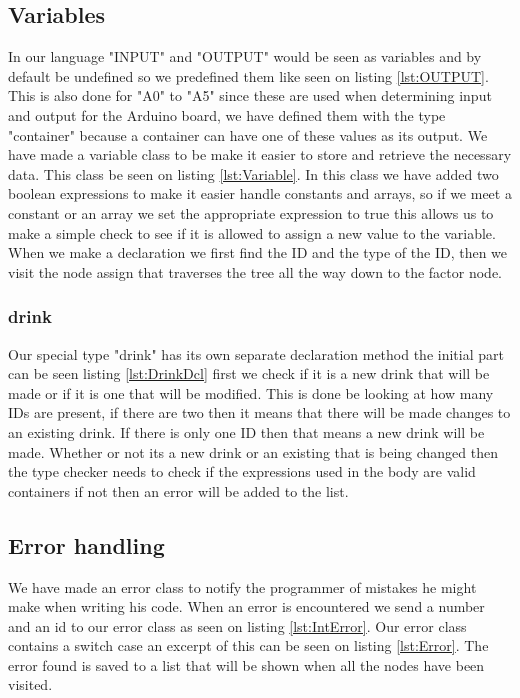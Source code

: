 \subsection*{Variables}
In our language "INPUT" and "OUTPUT" would be seen as variables and by default be undefined so we predefined them like seen on listing \ref{lst:OUTPUT}. This is also done for "A0" to "A5" since these are used when determining input and output for the Arduino board, we have defined them with the type "container" because a container can have one of these values as its output.
We have made a variable class to be make it easier to store and retrieve the necessary data. This class be seen on listing \ref{lst:Variable}. In this class we have added two boolean expressions to make it easier handle constants and arrays, so if we meet a constant or an array we set the appropriate expression to true this allows us to make a simple check to see if it is allowed to assign a new value to the variable.
When we make a declaration we first find the ID and the type of the ID, then we visit the node assign that traverses the tree all the way down to the factor node.

\subsubsection*{drink}
Our special type "drink" has its own separate declaration method the initial part can be seen listing \ref{lst:DrinkDcl} first we check if it is a new drink that will be made or if it is one that will be modified. This is done be looking at how many IDs are present, if there are two then it means that there will be made changes to an existing drink. If there is only one ID then that means a new drink will be made.
Whether or not its a new drink or an existing that is being changed then the type checker needs to check if the expressions used in the body are valid containers if not then an error will be added to the list.

\subsection*{Error handling}
We have made an error class to notify the programmer of mistakes he might make when writing his code. When an error is encountered we send a number and an id to our error class as seen on listing \ref{lst:IntError}.
Our error class contains a switch case an excerpt of this can be seen on listing \ref{lst:Error}. The error found is saved to a list that will be shown when all the nodes have been visited.
